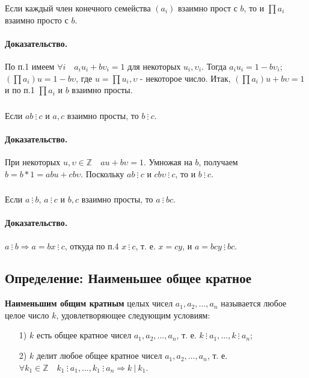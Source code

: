 \documentclass{article}
\newcommand{\divs}{~\vdots~}
\begin{document}
\subsubsection{}
Если каждый член конечного семейства $(a_i)$ взаимно прост с $b$, то и $\prod a_i$ взаимно просто с $b$.
\paragraph{Доказательство.}
По п.1 имеем $\forall i \quad a_i u_i + b \upsilon_i = 1$ для некоторых $u_i, \upsilon_i$. Тогда $a_i u_i = 1 - b \upsilon_i$; $(\prod a_i)u = 1 - b \upsilon$, где $u = \prod u_i, \upsilon$ - некоторое число. Итак, $(\prod a_i) u + b \upsilon = 1$ и по п.1 $\prod a_i$ и $b$ взаимно просты.

\subsubsection{}
Если $ab \divs c$ и $a, c$ взаимно просты, то $b \divs c$.
\paragraph{Доказательство.}
При некоторых $u, \upsilon \in \mathbb Z \quad au + b \upsilon = 1$. Умножая на $b$, получаем $b = b * 1 = abu + cb\upsilon$. Поскольку $ab \divs c$ и $cb\upsilon \divs c$, то и $b \divs c$.

\subsubsection{}
Если $a \divs b$, $a \divs c$ и $b, c$ взаимно просты, то $a \divs bc$.
\paragraph{Доказательство.}
$a \divs b \Rightarrow a = bx \divs c$, откуда по п.4 $x \divs c$, т. е. $x = cy$, и $a = bcy \divs bc$.

\subsection{Определение: Наименьшее общее кратное}
\textbf{Наименьшим общим кратным} целых чисел $a_1, a_2, \dots, a_n$ называется любое целое число $k$, удовлетворяющее следующим условиям:
\begin{enumerate}
\item[1)] $k$ есть общее кратное чисел $a_1, a_2, \dots, a_n$, т. е. $k \divs a_1, \dots, k \divs a_n$;
\item[2)] $k$ делит любое общее кратное чисел $a_1, a_2, \dots, a_n$, т. е. $\forall k_1 \in \mathbb Z \quad k_1 \divs a_1, \dots, k_1 \divs a_n \Rightarrow k~\vert~k_1$.
\end{enumerate}
\end{document}
